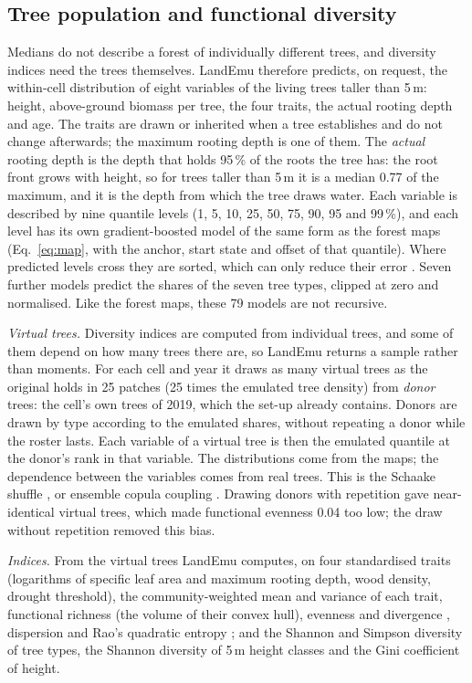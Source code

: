 \documentclass[11pt,a4paper]{article}
\begin{document}
\subsection{Tree population and functional diversity}\label{sec:pop}

Medians do not describe a forest of individually different trees, and diversity indices need the trees themselves.
LandEmu therefore predicts, on request, the within-cell distribution of eight variables of the living trees taller
than 5\,m: height, above-ground biomass per tree, the four traits, the actual rooting depth and age. The traits are
drawn or inherited when a tree establishes and do not change afterwards; the maximum rooting depth is one of them. The
\emph{actual} rooting depth is the depth that holds 95\,\% of the roots the tree has: the root front grows with
height, so for trees taller than 5\,m it is a median 0.77 of the maximum, and it is the depth from which the tree draws
water. Each variable is described by nine quantile levels (1, 5, 10, 25, 50, 75, 90, 95 and 99\,\%), and each level has
its own gradient-boosted model of the same form as the forest maps (Eq.~\ref{eq:map}, with the anchor, start state and offset of
that quantile). Where predicted levels cross they are sorted, which can only reduce their error
\citep{Chernozhukov2010}. Seven further models predict the shares of the seven tree types, clipped at zero and
normalised. Like the forest maps, these 79 models are not recursive.

\emph{Virtual trees.} Diversity indices are computed from individual trees, and some of them depend on how many trees
there are, so LandEmu returns a sample rather than moments. For each cell and year it draws as many virtual trees as the
original holds in 25 patches (25 times the emulated tree density) from \emph{donor} trees: the cell's own trees of
2019, which the set-up already contains. Donors are drawn by type according to the emulated shares, without repeating a
donor while the roster lasts. Each variable of a virtual tree is then the emulated quantile at the donor's rank in
that variable. The distributions come from the maps; the dependence between the variables comes from real trees. This
is the Schaake shuffle \citep{Clark2004Schaake}, or ensemble copula coupling \citep{Schefzik2013ECC}. Drawing donors
with repetition gave near-identical virtual trees, which made functional evenness 0.04 too low; the draw without
repetition removed this bias.

\emph{Indices.} From the virtual trees LandEmu computes, on four standardised traits (logarithms of specific leaf area
and maximum rooting depth, wood density, drought threshold), the community-weighted mean and variance of each trait,
functional richness (the volume of their convex hull), evenness and divergence \citep{Villeger2008}, dispersion
\citep{Laliberte2010} and Rao's quadratic entropy \citep{Rao1982}; and the Shannon and Simpson diversity of tree types,
the Shannon diversity of 5\,m height classes and the Gini coefficient of height.
\end{document}
